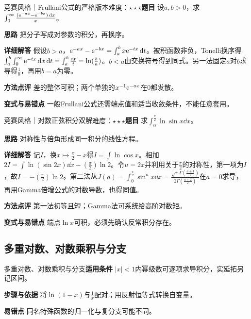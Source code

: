 \begin{example}{竞赛风格｜Frullani公式的严格版本}{难度：$\star\star\star$}\label{deep:ex:integral_special_deep:frullani}\textbf{题目} 设$a,b>0$，求$\int_0^\infty\frac{(\mathrm{e}^{-ax}-\mathrm{e}^{-bx})\mathop{}\!\mathrm{d} x}{x}$。\par\textbf{思路} 把分子写成对参数的积分，再换序。\par\textbf{详细解答} 假设$b>a$，$\mathrm{e}^{-ax}-\mathrm{e}^{-bx}=\int_a^b x\mathrm{e}^{-tx}\mathop{}\!\mathrm{d} t$。被积函数非负，Tonelli换序得$\int_a^b\int_0^\infty\mathrm{e}^{-tx}\mathop{}\!\mathrm{d} x\mathop{}\!\mathrm{d} t=\int_a^b\frac{\mathop{}\!\mathrm{d} t}{t}=\ln(\frac{b}{a})$。$b<a$由交换符号得到同式。另一法固定$a$对$b$求导得$\frac{1}{b}$，再用$b=a$为零。\par\textbf{方法点评} 差的整体可积；两个单独的$x^{-1}\mathrm{e}^{-ax}$在0都发散。\par\textbf{变式与易错点} 一般Frullani公式还需端点值和适当收敛条件，不能任意套用。\end{example}

\begin{example}{竞赛风格｜对数正弦积分双解}{难度：$\star\star\star$}\label{deep:ex:integral_special_deep:logsin}\textbf{题目} 求$\int_0^{\frac{\pi}{2}}\ln\sin x\dd x$。\par\textbf{思路} 对称性与倍角形成同一积分的线性方程。\par\textbf{详细解答} 记$I$，换$x\mapsto\frac{\pi}{2}-x$得$I=\int\ln\cos x$。相加$2I=\int\ln(\sin2x)\dd x-(\frac{\pi}{2})\ln2$。令$u=2x$并利用关于$\frac{\pi}{2}$的对称性，第一项为$I$，故$I=-(\frac{\pi}{2})\ln2$。第二法从$J(a)=\int_0^{\frac{\pi}{2}}\sin^ax\dd x=\frac{\sqrt\pi\Gamma(\frac{a+1}{2})}{2\Gamma(\frac{a+2}{2})}$在$a=0$求导，再用Gamma倍增公式的对数导数，也得同值。\par\textbf{方法点评} 第一法初等且短；Gamma法可系统给高阶对数矩。\par\textbf{变式与易错点} 端点$\ln x$可积，必须先确认反常积分存在。\end{example}

\subsection{多重对数、对数乘积与分支}\label{deep:integral_special_deep:polylog}

\begin{method}{多重对数、对数乘积与分支}\textbf{适用条件} $|x|<1$内幂级数可逐项求导积分，实延拓另记区间。\par\textbf{步骤与依据} 将$\ln(1-x)$与$\frac{1}{x}$配对；用反射恒等式转换自变量。\par\textbf{易错点} 同名特殊函数的归一化与复分支可能不同。\end{method}


